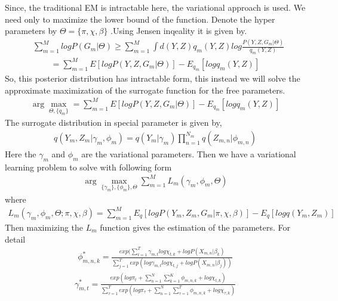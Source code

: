 \documentclass[letterpaper]{article}
\begin{document}
Since, the traditional EM is intractable here, the variational approach is used. We need only to maximize the lower bound of the function.
Denote the hyper parameters by $\Theta = \{\pi, \chi,\beta\}$ .Using Jensen inqeality it is given by. 
\begin{align}
&\sum_{m=1}^{M}log P(G_m | \Theta)
\geq \sum\limits_{m=1}^{M} \int d(Y,Z)q_m(Y,Z) log\frac{P(Y,Z,G_m |\Theta)}{q_{m}(Y,Z)}
\end{align}
\begin{align}
=\sum\limits_{m=1}^{M} E[log P(Y,Z,G_m|\Theta)] - E_{q_m} [log q_m (Y,Z)]
\end{align}
So, this posterior distribution has intractable form, this instead we will solve the approximate maximization of the surrogate function for the free parameters.
\begin{align}
 \arg\max\limits_{\Theta,\{q_m\}}=\sum\limits_{m=1}^{M} E[log P(Y,Z,G_m|\Theta)] - E_{q_m} [log q_m (Y,Z)]
\end{align}
The surrogate distribution in special parameter is given by,
\begin{align}
 q(Y_m,Z_m | \gamma_m,\phi_m) = q(Y_m|\gamma_m) \prod_{n=1}^{N_m} q(Z_{m,n}|\phi_{m,n})
\end{align}
Here the $\gamma_m$ and $\phi_m$ are the variational parameters.
Then we have a variational learning problem to solve with following form
\begin{align}
\arg\max\limits_{\{\gamma_m\},\{ \phi_m \},\Theta}\sum_{m=1}^{M} L_m (\gamma_m,\phi_m,\Theta)
\end{align}
where 
\begin{align}
L_m (\gamma_m,\phi_m,\Theta ; \pi,\chi,\beta) = \sum\limits_{m=1}^{M}
E_q[log P(Y_m,Z_m,G_m|\pi,\chi,\beta)] - E_{q} [log q (Y_m,Z_m)] 
\end{align}
Then maximizing the $L_m$ function gives the estimation of the parameters. For detail \cite{xiong2011hierarchical}
\begin{align}
\phi_{m,n,k}^{*} = \frac{exp(\sum\limits_{t=1}^T\gamma_{m,t}log\chi_{t,k} + log P(X_{m,n}|\beta_k)}{\sum\limits_{j=1}^T exp(log\gamma_{m,t}log\chi_{t,j} + log P(X_{m,n}|\beta_j))}
\end{align}
\begin{align}
\gamma_{m,t}^* = \frac{exp(log\pi_t + \sum\limits_{n=1}^N\sum\limits_{k=1}^K \phi_{m,n,k}+log\chi_{t,k})}{\sum\limits_{\tau=1}^T exp(log \pi _\tau + \sum\limits_{n=1}^N\sum\limits_{\tau=1}^T \phi_{m,n,k}+log\chi_{\tau,k})}
\end{align}
\end{document}
